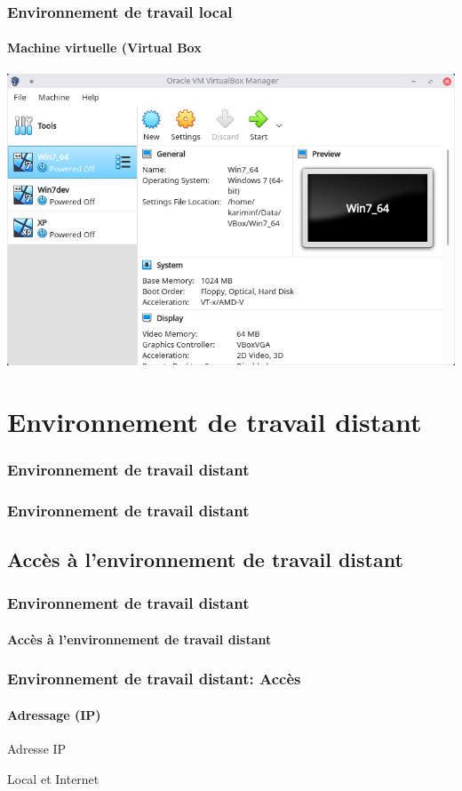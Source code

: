 \documentclass{beamer}
\begin{document}
\begin{frame}
\frametitle{Environnement de travail local}
\framesubtitle{Machine virtuelle (Virtual Box}

\begin{center}
	\includegraphics[height=
.8\textheight]{../img/Bweb01-environnement/vbox.png}
\end{center}

\end{frame}


\section{Environnement de travail distant}

\begin{frame}
\frametitle{Environnement de travail distant}

\end{frame}

\begin{frame}
\frametitle{Environnement de travail distant}

\end{frame}

\subsection{Accès à l'environnement de travail distant}

\begin{frame}
\frametitle{Environnement de travail distant}
\framesubtitle{Accès à l'environnement de travail distant}

\end{frame}

\begin{frame}
\frametitle{Environnement de travail distant: Accès}
\framesubtitle{Adressage (IP)}

Adresse IP

Local et Internet

\end{frame}
\end{document}
